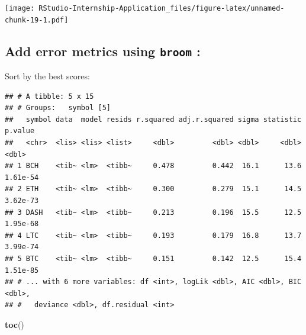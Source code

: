 \documentclass[
]{book}
\newenvironment{Shaded}{\begin{snugshade}}{\end{snugshade}}
\newcommand{\DataTypeTok}[1]{\textcolor[rgb]{0.13,0.29,0.53}{#1}}
\newcommand{\KeywordTok}[1]{\textcolor[rgb]{0.13,0.29,0.53}{\textbf{#1}}}
\newcommand{\NormalTok}[1]{#1}
\newcommand{\OperatorTok}[1]{\textcolor[rgb]{0.81,0.36,0.00}{\textbf{#1}}}
\newcommand{\StringTok}[1]{\textcolor[rgb]{0.31,0.60,0.02}{#1}}
\begin{document}
\texttt{[image: RStudio-Internship-Application\_files/figure-latex/unnamed-chunk-19-1.pdf]}

\hypertarget{add-error-metrics-using-broom-r-broom}{%
\subsection{\texorpdfstring{Add error metrics using \texttt{broom} \citep{R-broom}:}{Add error metrics using broom {[}@R-broom{]}:}}\label{add-error-metrics-using-broom-r-broom}}

\begin{Shaded}
\end{Shaded}

Sort by the best scores:

\begin{Shaded}
\end{Shaded}

\begin{verbatim}
## # A tibble: 5 x 15
## # Groups:   symbol [5]
##   symbol data  model resids r.squared adj.r.squared sigma statistic  p.value
##   <chr>  <lis> <lis> <list>     <dbl>         <dbl> <dbl>     <dbl>    <dbl>
## 1 BCH    <tib~ <lm>  <tibb~     0.478         0.442  16.1      13.6 1.61e-54
## 2 ETH    <tib~ <lm>  <tibb~     0.300         0.279  15.1      14.5 3.62e-73
## 3 DASH   <tib~ <lm>  <tibb~     0.213         0.196  15.5      12.5 1.95e-68
## 4 LTC    <tib~ <lm>  <tibb~     0.193         0.179  16.8      13.7 3.99e-74
## 5 BTC    <tib~ <lm>  <tibb~     0.151         0.142  12.5      15.4 1.51e-85
## # ... with 6 more variables: df <int>, logLik <dbl>, AIC <dbl>, BIC <dbl>,
## #   deviance <dbl>, df.residual <int>
\end{verbatim}

\begin{Shaded}
\begin{Highlighting}[]
\KeywordTok{toc}\NormalTok{()}
\end{Highlighting}
\end{Shaded}
\end{document}
